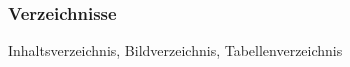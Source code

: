 \begin{frame}
    \frametitle{Verzeichnisse}
    \begin{block}{Inhaltsverzeichnis, Bildverzeichnis, Tabellenverzeichnis}
        
    \end{block}
\end{frame}
